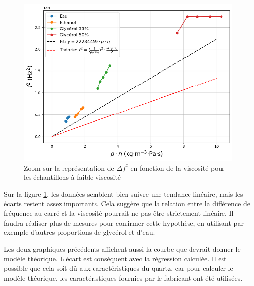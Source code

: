 \begin{figure}[H]
    \centering
    \includegraphics[width=\textwidth]{assets/figures/FrequViscZoom.png}
    \caption{Zoom sur la représentation de $\Delta f^2$ en fonction de la viscosité pour les échantillons à faible viscosité}
    \label{fig:Frequence carré VS Viscosité Zoom}
\end{figure}

Sur la figure \ref{fig:Frequence carré VS Viscosité Zoom}, les données semblent bien suivre une tendance linéaire, mais les écarts restent assez importants.  
Cela suggère que la relation entre la différence de fréquence au carré et la viscosité pourrait ne pas être strictement linéaire.  
Il faudra réaliser plus de mesures pour confirmer cette hypothèse, en utilisant par exemple d’autres proportions de glycérol et d’eau.

Les deux graphiques précédents affichent aussi la courbe que devrait donner le modèle théorique.  
L'écart est conséquent avec la régression calculée.  
Il est possible que cela soit dû aux caractéristiques du quartz, car pour calculer le modèle théorique, les caractéristiques fournies par le fabricant ont été utilisées.

